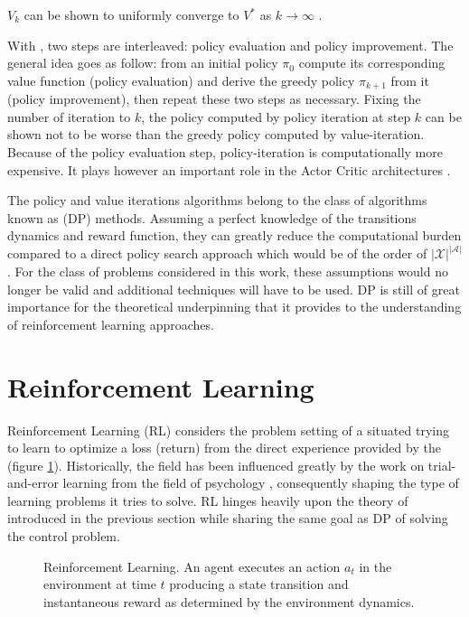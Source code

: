 $V_k$ can be shown to uniformly converge to $V^*$ as $k \to \infty$ \cite{Ross1983}.

With , two steps are interleaved: policy evaluation and
policy improvement. The general idea goes as follow: from an initial policy $\pi_0$
compute its corresponding value function (policy evaluation) and derive the greedy
policy $\pi_{k+1}$ from it (policy improvement), then repeat these two steps as
necessary. Fixing the number of iteration to $k$, the policy computed by policy
iteration at step $k$ can be shown not to be worse than the greedy policy computed
by value-iteration. Because of the policy evaluation step, policy-iteration is
computationally more expensive. It plays however an important role in the Actor
Critic architectures \cite{Sutton1984}.

The policy and value iterations algorithms belong to the class of algorithms known as
 (DP) methods. Assuming a perfect knowledge of the
transitions dynamics and reward function, they can greatly reduce the computational
burden compared to a direct policy search approach which would be of the order of
$\left\vert \mathcal{X} \right\vert^{\left\vert \mathcal{A} \right\vert}$. For the class of problems considered in this work, these assumptions would no longer be valid and
additional techniques will have to be used. DP is still of great importance for the
theoretical underpinning that it provides to the understanding of reinforcement
learning approaches.

\section{Reinforcement Learning}

Reinforcement Learning (RL) considers the problem setting of a situated
 trying to learn to optimize a loss (return) from the direct experience
provided by the  (figure \ref{fig:rl}). Historically, the field has
been influenced greatly by the work on trial-and-error learning from the field of
psychology \cite{Sutton1998}, consequently shaping the type of learning problems it tries to solve. RL hinges heavily upon the theory of \mdps introduced in the previous section while sharing the same goal as DP of solving the control problem. 

\begin{figure}
  \centering
  
  \caption{Reinforcement Learning. An agent executes an action $a_t$ in the
  environment at time $t$ producing a state transition and instantaneous reward as
  determined by the environment dynamics.}
  \label{fig:rl}
\end{figure}

